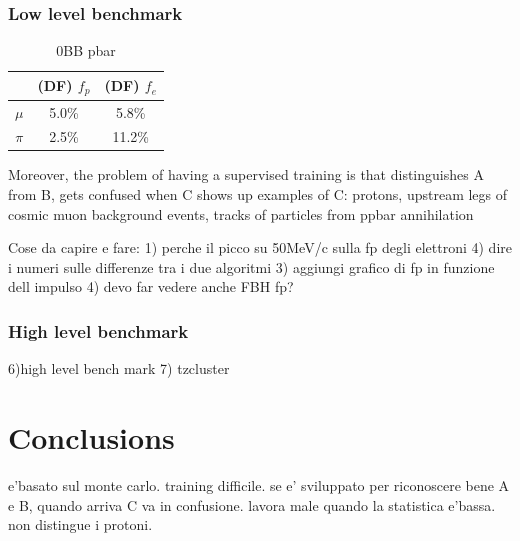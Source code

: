 \subsubsection{Low level benchmark}
\begin{center}
    \begin{table}[h!]
    \centering
    \renewcommand{\arraystretch}{1.}
    \begin{tabular}{| c | c | c |} 
    \hline
    & (DF) $f_{p}$  &  (DF) $f_{e}$\\
    \hline
    $\mu$ &   5.0\% & 5.8\%\\
    \hline
    $\pi$ & 2.5\% & 11.2\%\\
    \hline
    \end{tabular}
    \caption{0BB pbar}
    \end{table}\label{tab:0bbpbar}
    \end{center}


   
    


    Moreover, the problem of having a supervised training is that 
    distinguishes A from B, gets confused when C shows up
    examples of C: protons, upstream legs of cosmic muon background events,
    tracks of particles from ppbar annihilation
    
    Cose da capire e fare: 
    1) perche il picco su 50MeV/c sulla fp degli elettroni
    4) dire i numeri sulle differenze tra i due algoritmi
    3) aggiungi grafico di fp in funzione dell impulso
    4) devo far vedere anche FBH fp?

\subsubsection{High level benchmark}
6)high level bench mark
7) tzcluster
\section{Conclusions}
e'basato sul monte carlo. training difficile. se e' sviluppato per 
riconoscere bene A e B, quando arriva C va in confusione. lavora male quando la statistica e'bassa. 
non distingue i protoni.

\iffalse

